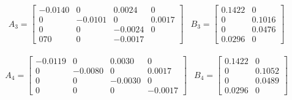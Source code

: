 \begin{align*} %
	& A_3 =
	\begin{bmatrix}
	   -0.0140 &        0 &   0.0024 &        0 \\
			0  & -0.0101  &       0  &  0.0017 \\
			0  &       0  & -0.0024  &       0 \\
			0  7       0  &       0  & -0.0017
	\end{bmatrix}
	& B_3 =
	\begin{bmatrix}
	    0.1422 &       0 \\
			0  &  0.1016 \\
			0  &  0.0476 \\
		0.0296 &       0 
	\end{bmatrix}
\end{align*}
		
\begin{align*} %
	& A_4 =
	\begin{bmatrix}
   -0.0119 &       0  &  0.0030 &        0 \\
		0  & -0.0080  &       0 &   0.0017 \\
		0  &       0  & -0.0030 &        0 \\
		0  &       0  &       0 &  -0.0017
	\end{bmatrix}
	& B_4 =
	\begin{bmatrix}
	0.1422 &       0 \\
		0  &  0.1052 \\
		0  &  0.0489 \\
	0.0296 &       0
	\end{bmatrix}
\end{align*}

